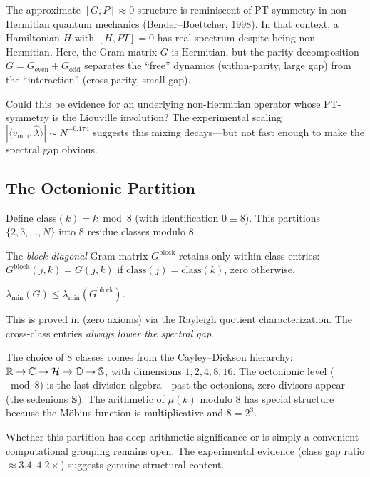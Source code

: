 \documentclass[11pt,a4paper]{article}
\begin{document}
\begin{direction}
The approximate $[G, P] \approx 0$ structure is reminiscent of
PT-symmetry in non-Hermitian quantum mechanics (Bender--Boettcher, 1998).
In that context, a Hamiltonian $H$ with $[H, PT] = 0$ has real spectrum
despite being non-Hermitian. Here, the Gram matrix $G$ is Hermitian, but
the parity decomposition $G = G_{\mathrm{even}} + G_{\mathrm{odd}}$
separates the ``free'' dynamics (within-parity, large gap) from the
``interaction'' (cross-parity, small gap).

Could this be evidence for an underlying non-Hermitian operator whose
PT-symmetry is the Liouville involution? The experimental scaling
$|{\langle v_{\min}, \hat{\lambda}\rangle}| \sim N^{-0.174}$ suggests
this mixing decays---but not fast enough to make the spectral gap
obvious.
\end{direction}

\subsection{The Octonionic Partition}

\begin{definition}
Define $\mathrm{class}(k) = k \bmod 8$ (with identification $0 \equiv 8$).
This partitions $\{2, 3, \ldots, N\}$ into 8 residue classes modulo 8.
\end{definition}

The \emph{block-diagonal} Gram matrix $G^{\mathrm{block}}$ retains only
within-class entries: $G^{\mathrm{block}}(j,k) = G(j,k)$ if
$\mathrm{class}(j) = \mathrm{class}(k)$, zero otherwise.

\begin{theorem}
$\lambda_{\min}(G) \le \lambda_{\min}(G^{\mathrm{block}})$.
\end{theorem}

This is proved in  (zero axioms) via the
Rayleigh quotient characterization. The cross-class entries \emph{always
lower the spectral gap}.

\begin{remark}[Why 8?]
The choice of 8 classes comes from the Cayley--Dickson hierarchy:
$\mathbb{R} \to \mathbb{C} \to \mathcal{H} \to \mathbb{O} \to \mathbb{S}$, with dimensions $1, 2, 4, 8, 16$.
The octonionic level ($\bmod 8$) is the last division algebra---past the
octonions, zero divisors appear (the sedenions $\mathbb{S}$). The arithmetic
of $\mu(k)$ modulo 8 has special structure because the M\"obius function
is multiplicative and $8 = 2^3$.

Whether this partition has deep arithmetic significance or is simply a
convenient computational grouping remains open. The experimental
evidence (class gap ratio $\approx 3.4$--$4.2\times$) suggests
genuine structural content.
\end{remark}
\end{document}
